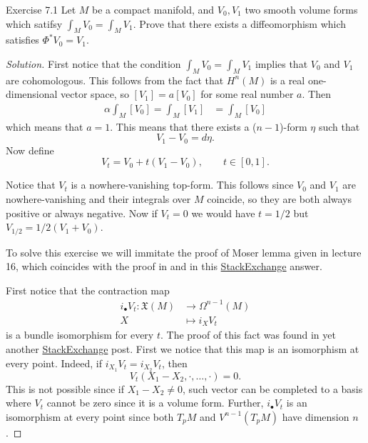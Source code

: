 \begin{thing1}{Exercise 7.1}\leavevmode
Let $M$ be a compact manifold, and $V_0,V_1$ two smooth volume forms which satifsy  $ \int_{M}V_0=\int_{M}V_1$. Prove that there exists a diffeomorphism which satisfies $\Phi^*V_0=V_1$.
\end{thing1}
\begin{proof}[Solution]\leavevmode
First notice that the condition $\int_{M}V_0=\int_{M}V_1$ implies that $V_0$ and $V_1$ are cohomologous. This follows from the fact that $H^n(M)$ is a real one-dimensional vector space, so $[V_1]=a[V_0]$ for some real number  $a$. Then
\begin{align*}
	\alpha\int_{M}[V_0]=\int_{M}[V_1]&=\int_{M}[V_0]
\end{align*}
which means that $a=1$. This means that there exists a  ($n-1$)-form $\eta$ such that
\[V_1-V_0=d\eta.\]
Now define
\[V_t=V_0+t\left(V_1-V_0\right),\qquad t\in[0,1].\]

Notice that $V_t$ is a nowhere-vanishing top-form. This follows since $ V_0$ and $V_1$ are nowhere-vanishing and their integrals over $M$ coincide, so they are both always positive or always negative. Now if $V_t=0$ we would have $t=1/2$ but  $V_{1/2}=1/2(V_1+V_0)$.

To solve this exercise we will immitate the proof of Moser lemma given in lecture 16, which coincides with the proof in \cite{lee} and in this \href{https://math.stackexchange.com/questions/3528448/equal-volume-iff-there-is-a-diffeomorphism}{StackExchange} answer.

First notice that the contraction map
\begin{equation}\label{eq:1}
\begin{aligned}
	i_\bullet V_t: \mathfrak{X}(M) &\longrightarrow \Omega^{n-1}(M) \\
	X &\longmapsto i_X V_t
\end{aligned}
\end{equation}
is a bundle isomorphism for every $t$. The proof of this fact was found in yet another \href{https://math.stackexchange.com/questions/3403451/if-omega-is-a-volume-form-then-x-mapsto-i-x-omega-generates-all-n-1-fo}{StackExchange} post. First we notice that this map is an isomorphism at every point. Indeed, if $i_{X_1}V_t=i_{X_2}V_t$, then
\[V_t(X_1-X_2,\cdot,\ldots,\cdot)=0.\]
This is not possible since if $X_1-X_2\neq 0$, such vector can be completed to a basis where $V_t$ cannot be zero since it is a volume form. Further, $i_\bullet V_t$ is an isomorphism at every point since both $T_pM$ and $V^{n-1}(T_pM)$ have dimension $n$.


\end{proof}
